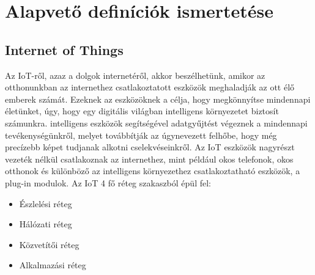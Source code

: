 \chapter{Alapvető definíciók ismertetése}

\section{Internet of Things}
Az IoT-ről, azaz a dolgok internetéről, akkor beszélhetünk, amikor az otthonunkban az internethez csatlakoztatott eszközök meghaladják az ott élő emberek számát. Ezeknek az eszközöknek a célja, hogy megkönnyítse mindennapi életünket, úgy, hogy egy digitális világban intelligens környezetet biztosít számunkra. intelligens eszközök segítségével adatgyűjtést végeznek a mindennapi tevékenységünkről, melyet továbbítják az úgynevezett felhőbe, hogy még precízebb képet tudjanak alkotni cselekvéseinkről. Az IoT eszközök nagyrészt vezeték nélkül csatlakoznak az internethez, mint például okos telefonok, okos otthonok és különböző az intelligens környezethez csatlakoztatható eszközök, a plug-in modulok.
\newline Az IoT 4 fő réteg szakaszból épül fel:\cite{smart-research}
\begin{itemize}
    \setlength\itemsep{-2pt}
    \item Észlelési réteg
    \item Hálózati réteg
    \item Közvetítői réteg
    \item Alkalmazási réteg 
\end{itemize}

